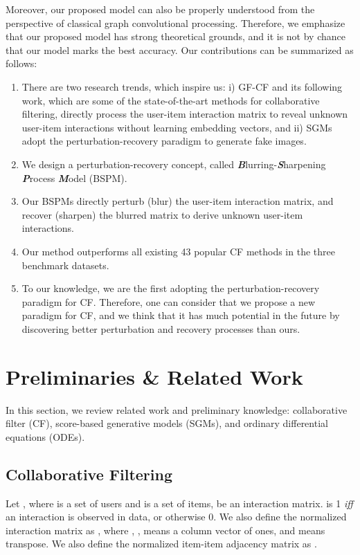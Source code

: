 \documentclass[sigconf,natbib=true]{acmart}
\begin{document}
Moreover, our proposed model can also be properly understood from the perspective of classical graph convolutional processing. Therefore, we emphasize that our proposed model has strong theoretical grounds, and it is not by chance that our model marks the best accuracy. Our contributions can be summarized as follows:
\begin{enumerate}
    \item There are two research trends, which inspire us: i) GF-CF and its following work, which are some of the state-of-the-art methods for collaborative filtering, directly process the user-item interaction matrix to reveal unknown user-item interactions without learning embedding vectors, and ii) SGMs adopt the perturbation-recovery paradigm to generate fake images.
    \item We design a perturbation-recovery concept, called \textit{\textbf{B}}lurring-\textit{\textbf{S}}harpening \textit{\textbf{P}}rocess \textit{\textbf{M}}odel (BSPM).
    \item Our BSPMs directly perturb (blur) the user-item interaction matrix, and recover (sharpen) the blurred matrix to derive unknown user-item interactions.
    \item Our method outperforms all existing 43 popular CF methods in the three benchmark datasets. 
\item To our knowledge, we are the first adopting the perturbation-recovery paradigm for CF. Therefore, one can consider that we propose a new paradigm for CF, and we think that it has much potential in the future by discovering better perturbation and recovery processes than ours.
\end{enumerate}


\section{Preliminaries \& Related Work}
In this section, we review related work and preliminary knowledge: collaborative filter (CF), score-based generative models (SGMs), and ordinary differential equations (ODEs).

\subsection{Collaborative Filtering}
Let , where  is a set of users and  is a set of items, be an interaction matrix.  is 1 \textit{iff} an interaction  is observed in data, or otherwise 0. We also define the normalized interaction matrix as , where , ,  means a column vector of ones, and  means transpose. We also define the normalized item-item adjacency matrix as .
\end{document}
